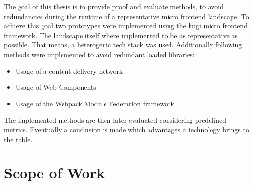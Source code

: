 The goal of this thesis is to provide proof and evaluate methods, to avoid redundancies during the runtime of a representative micro frontend landscape. To achieve this goal two prototypes were implemented using the luigi micro frontend framework. The landscape itself where implemented to be as representative as possible. That means, a heterogenic tech stack was used. Additionally following methods were implemented to avoid redundant loaded libraries:

\begin{itemize}
	\item Usage of a content delivery network
	\item Usage of Web Components 
	\item Usage of the Webpack Module Federation framework
\end{itemize}

The implemented methods are then later evaluated considering predefined metrics. 
Eventually a conclusion is made which advantages a technology brings to the table.
  
\section{Scope of Work}


